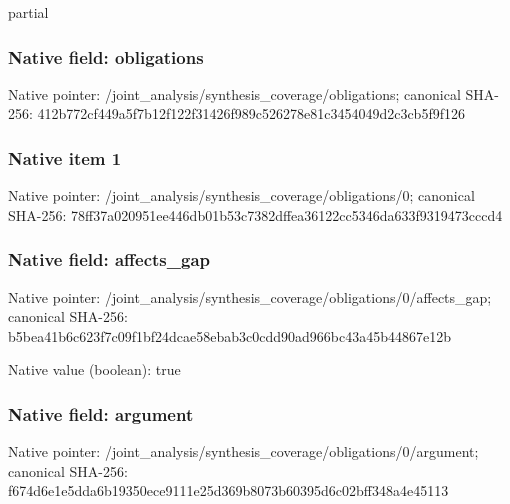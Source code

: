 \documentclass[10pt,a4paper]{article}
\begin{document}
\begingroup\raggedright\sloppy partial\par\endgroup

\subsubsection{Native field: obligations}
Native pointer: /joint\_\allowbreak{}analysis/synthesis\_\allowbreak{}coverage/obligations; canonical SHA-256: 412b772cf449a5f7b12f122f31426f989c526278e81c3454049d2c3cb5f9f126

\subsubsection{Native item 1}
Native pointer: /joint\_\allowbreak{}analysis/synthesis\_\allowbreak{}coverage/obligations/0; canonical SHA-256: 78ff37a020951ee446db01b53c7382dffea36122cc5346da633f9319473cccd4

\subsubsection{Native field: affects\_\allowbreak{}gap}
Native pointer: /joint\_\allowbreak{}analysis/synthesis\_\allowbreak{}coverage/obligations/0/affects\_\allowbreak{}gap; canonical SHA-256: b5bea41b6c623f7c09f1bf24dcae58ebab3c0cdd90ad966bc43a45b44867e12b

Native value (boolean): true

\subsubsection{Native field: argument}
Native pointer: /joint\_\allowbreak{}analysis/synthesis\_\allowbreak{}coverage/obligations/0/argument; canonical SHA-256: f674d6e1e5dda6b19350ece9111e25d369b8073b60395d6c02bff348a4e45113
\end{document}
